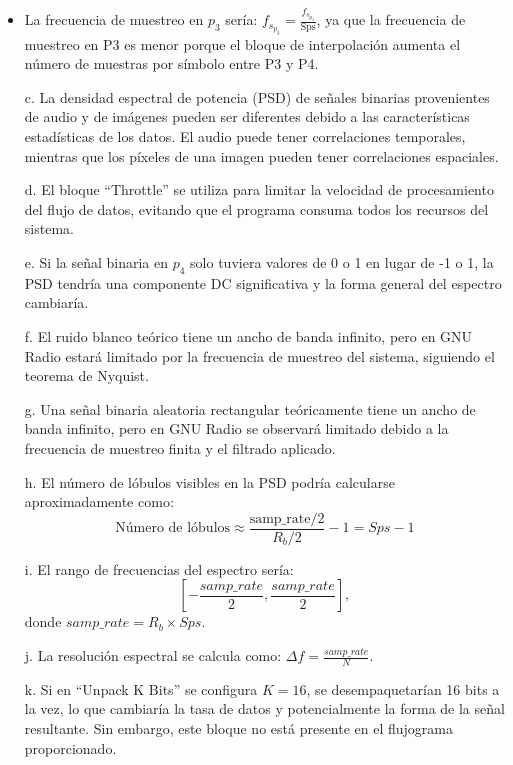\documentclass{journal}[IEEEtran, twocolumn]             %
\begin{document}
\begin{multicols}{2}
\begin{itemize}
    \item La frecuencia de muestreo en \(p_3\) sería: \(f_{s_{p_3}} = \frac{f_{s_{p_4}}}{\text{Sps}}\), ya que la frecuencia de muestreo en P3 es menor porque el bloque de interpolación aumenta el número de muestras por símbolo entre P3 y P4.
   
    
    \item[c.] La densidad espectral de potencia (PSD) de señales binarias provenientes de audio y de imágenes pueden ser diferentes debido a las características estadísticas de los datos. El audio puede tener correlaciones temporales, mientras que los píxeles de una imagen pueden tener correlaciones espaciales.
    
    \item[d.] El bloque ``Throttle''  se utiliza para limitar la velocidad de procesamiento del flujo de datos, evitando que el programa consuma todos los recursos del sistema.
    
    \item[e.] Si la señal binaria en \(p_4\) solo tuviera valores de 0 o 1 en lugar de -1 o 1, la PSD tendría una componente DC significativa y la forma general del espectro cambiaría.
    
    \item[f.] El ruido blanco teórico tiene un ancho de banda infinito, pero en GNU Radio estará limitado por la frecuencia de muestreo del sistema, siguiendo el teorema de Nyquist.
    
    \item[g.] Una señal binaria aleatoria rectangular teóricamente tiene un ancho de banda infinito, pero en GNU Radio se observará limitado debido a la frecuencia de muestreo finita y el filtrado aplicado.
    
    \item[h.] El número de lóbulos visibles en la PSD podría calcularse aproximadamente como: 
    \[
    \text{Número de lóbulos} \approx \frac{\text{samp\_rate}/2}{R_b/2} - 1 = Sps - 1
    \]
    \item[i.] El rango de frecuencias del espectro sería: 
    \[ \left[-\frac{samp\_rate}{2}, \frac{samp\_rate}{2}\right], \] donde \(samp\_rate = R_b \times Sps\).

    \item[j.] La resolución espectral se calcula como: \(\Delta f = \frac{samp\_rate}{N}\).
    
    \item[k.] Si en ``Unpack K Bits''  se configura \(K = 16\), se desempaquetarían 16 bits a la vez, lo que cambiaría la tasa de datos y potencialmente la forma de la señal resultante. Sin embargo, este bloque no está presente en el flujograma proporcionado.
    

\end{itemize}
\end{multicols}
\end{document}
